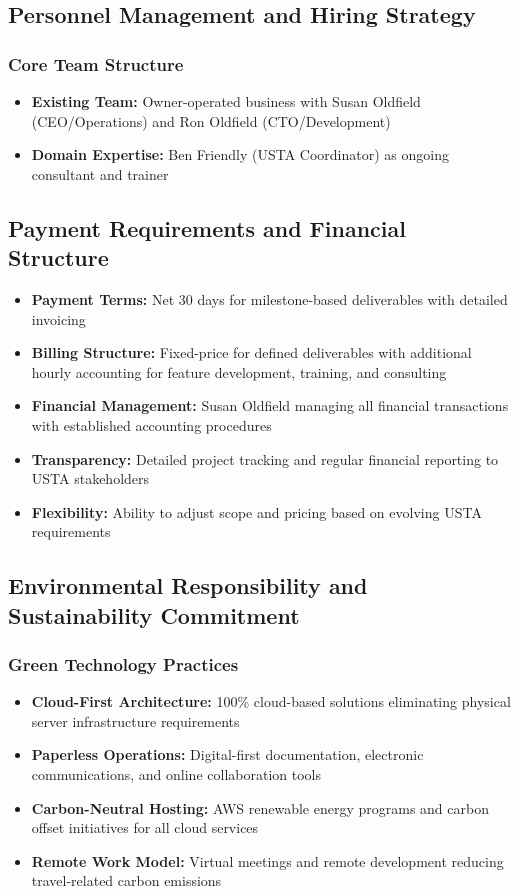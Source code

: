 \subsection{Personnel Management and Hiring Strategy}

\subsubsection{Core Team Structure}
\begin{itemize}
    \item \textbf{Existing Team:} Owner-operated business with Susan Oldfield (CEO/Operations) and Ron Oldfield (CTO/Development)
    \item \textbf{Domain Expertise:} Ben Friendly (USTA Coordinator) as ongoing consultant and trainer
\end{itemize}


\subsection{Payment Requirements and Financial Structure}
\begin{itemize}
    \item \textbf{Payment Terms:} Net 30 days for milestone-based deliverables with detailed invoicing
    \item \textbf{Billing Structure:} Fixed-price for defined deliverables with additional hourly accounting for feature development, training, and consulting
    \item \textbf{Financial Management:} Susan Oldfield managing all financial transactions with established accounting procedures
    \item \textbf{Transparency:} Detailed project tracking and regular financial reporting to USTA stakeholders
    \item \textbf{Flexibility:} Ability to adjust scope and pricing based on evolving USTA requirements
\end{itemize}

\subsection{Environmental Responsibility and Sustainability Commitment}

\subsubsection{Green Technology Practices}
\begin{itemize}
    \item \textbf{Cloud-First Architecture:} 100\% cloud-based solutions eliminating physical server infrastructure requirements
    \item \textbf{Paperless Operations:} Digital-first documentation, electronic communications, and online collaboration tools
    \item \textbf{Carbon-Neutral Hosting:} AWS renewable energy programs and carbon offset initiatives for all cloud services
    \item \textbf{Remote Work Model:} Virtual meetings and remote development reducing travel-related carbon emissions
\end{itemize}

